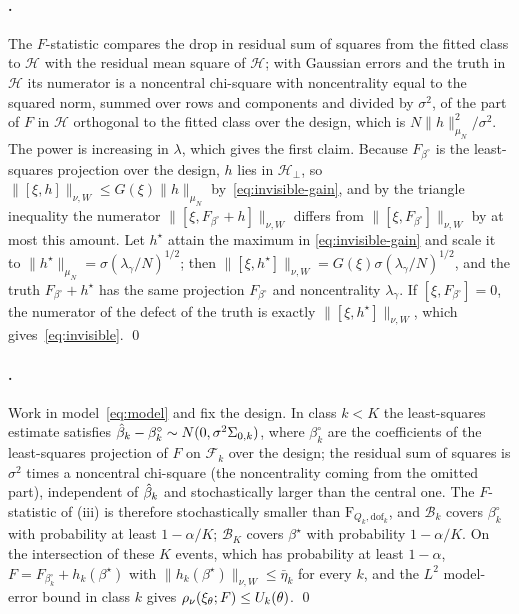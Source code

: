 \paragraph{.} The $F$-statistic compares the drop in residual
sum of squares from the fitted class to $\mathcal H$ with the residual mean
square of $\mathcal H$; with Gaussian errors and the truth in $\mathcal H$ its
numerator is a noncentral chi-square with noncentrality equal to the squared
norm, summed over rows and components and divided by $\sigma^2$, of the part
of $F$ in $\mathcal H$ orthogonal to the fitted class over the design, which is
$N\|h\|^2_{\mu_N}/\sigma^2$. The power is increasing in $\lambda$, which gives
the first claim. Because $F_{\beta^\circ}$ is the least-squares projection over
the design, $h$ lies in $\mathcal H_\perp$, so $\|[\xi,h]\|_{\nu,W} \le
G(\xi)\|h\|_{\mu_N}$ by~\eqref{eq:invisible-gain}, and by the triangle
inequality the numerator $\|[\xi,F_{\beta^\circ}+h]\|_{\nu,W}$ differs from
$\|[\xi,F_{\beta^\circ}]\|_{\nu,W}$ by at most this amount. Let $h^\star$
attain the maximum in
\eqref{eq:invisible-gain} and scale it to $\|h^\star\|_{\mu_N} =
\sigma(\lambda_\gamma/N)^{1/2}$; then $\|[\xi,h^\star]\|_{\nu,W} =
G(\xi)\sigma(\lambda_\gamma/N)^{1/2}$, and the truth $F_{\beta^\circ}+h^\star$
has the same projection $F_{\beta^\circ}$ and noncentrality $\lambda_\gamma$.
If $[\xi,F_{\beta^\circ}]=0$, the numerator of the defect of the truth is
exactly $\|[\xi,h^\star]\|_{\nu,W}$, which gives~\eqref{eq:invisible}. \qed

\paragraph{.} Work in model~\eqref{eq:model} and fix the
design. In class $k < K$ the
least-squares estimate satisfies $\hat{\beta}_k - \beta_k^\circ \sim N(0,
\sigma^2\Sigma_{0,k})$, where $\beta^\circ_k$ are the coefficients of the
least-squares projection of $F$ on $\mathcal F_k$ over the design; the residual
sum of squares is $\sigma^2$ times a noncentral chi-square (the noncentrality
coming from the omitted part), independent of $\hat{\beta}_k$ and stochastically
larger than the central one. The $F$-statistic of
(iii) is therefore stochastically smaller than
$\mathrm{F}_{Q_k,\mathrm{dof}_k}$, and $\mathcal B_k$ covers $\beta^\circ_k$ with
probability at least $1-\alpha/K$; $\mathcal B_K$ covers $\beta^\star$ with
probability $1-\alpha/K$. On the intersection of these $K$ events, which has
probability at least $1-\alpha$, $F = F_{\beta^\circ_k} + h_k(\beta^\star)$ with
$\|h_k(\beta^\star)\|_{\nu,W} \le \bar\eta_k$ for every $k$, and the $L^2$
model-error bound in class $k$ gives $\rho_\nu(\xi_\theta;F) \le
U_k(\theta)$. \qed

